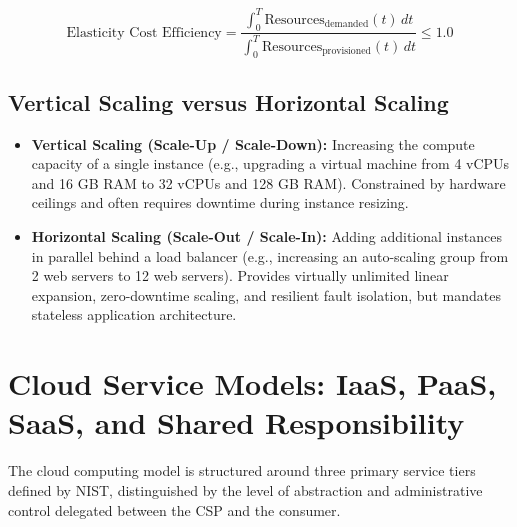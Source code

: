 \begin{equation}
\label{eq:elasticity_metric}
\text{Elasticity Cost Efficiency} = \frac{\int_{0}^{T} \text{Resources}_{\text{demanded}}(t)\,dt}{\int_{0}^{T} \text{Resources}_{\text{provisioned}}(t)\,dt} \le 1.0
\end{equation}

\subsection{Vertical Scaling versus Horizontal Scaling}
\begin{itemize}
    \item \textbf{Vertical Scaling (Scale-Up / Scale-Down):} Increasing the compute capacity of a single instance (e.g., upgrading a virtual machine from 4 vCPUs and 16 GB RAM to 32 vCPUs and 128 GB RAM). Constrained by hardware ceilings and often requires downtime during instance resizing.
    \item \textbf{Horizontal Scaling (Scale-Out / Scale-In):} Adding additional instances in parallel behind a load balancer (e.g., increasing an auto-scaling group from 2 web servers to 12 web servers). Provides virtually unlimited linear expansion, zero-downtime scaling, and resilient fault isolation, but mandates stateless application architecture.
\end{itemize}


\section{Cloud Service Models: IaaS, PaaS, SaaS, and Shared Responsibility}
\label{sec:cloud_service_models}

The cloud computing model is structured around three primary service tiers defined by NIST, distinguished by the level of abstraction and administrative control delegated between the CSP and the consumer.

